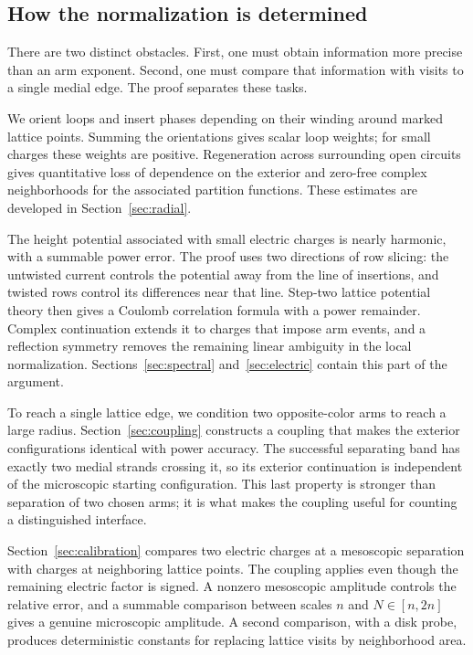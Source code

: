 \subsection{How the normalization is determined}

There are two distinct obstacles. First, one must obtain information
more precise than an arm exponent. Second, one must compare that
information with visits to a single medial edge. The proof separates
these tasks.

We orient loops and insert phases depending on their winding around
marked lattice points. Summing the orientations gives scalar loop
weights; for small charges these weights are positive. Regeneration
across surrounding open circuits gives quantitative loss of dependence
on the exterior and zero-free complex neighborhoods for the associated
partition functions. These estimates are developed in
Section~\ref{sec:radial}.

The height potential associated with small electric charges is nearly
harmonic, with a summable power error. The proof uses two directions
of row slicing: the untwisted current controls the potential away from
the line of insertions, and twisted rows control its differences near
that line. Step-two lattice potential theory then gives a Coulomb
correlation formula with a power remainder. Complex continuation
extends it to charges that impose arm events, and a reflection symmetry
removes the remaining linear ambiguity in the local normalization.
Sections~\ref{sec:spectral} and~\ref{sec:electric} contain this part of
the argument.

To reach a single lattice edge, we condition two opposite-color arms
to reach a large radius. Section~\ref{sec:coupling} constructs a
coupling that makes the exterior configurations identical with power
accuracy. The successful separating band has exactly two medial
strands crossing it, so its exterior continuation is independent of
the microscopic starting configuration. This last property is stronger
than separation of two chosen arms; it is what makes the coupling
useful for counting a distinguished interface.

Section~\ref{sec:calibration} compares two electric charges at a
mesoscopic separation with charges at neighboring lattice points.
The coupling applies even though the remaining electric factor is
signed. A nonzero mesoscopic amplitude controls the relative error,
and a summable comparison between scales $n$ and $N\in[n,2n]$ gives a
genuine microscopic amplitude. A second comparison, with a disk probe,
produces deterministic constants for replacing lattice visits by
neighborhood area.

